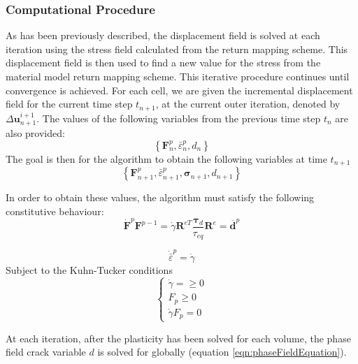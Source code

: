 \documentclass[sn-mathphys,Numbered,draft]{sn-jnl}%
\begin{document}
\subsubsection{Computational Procedure}

As has been previously described, the displacement field is solved at each iteration using the stress field calculated from the return mapping scheme. This displacement field is then used to find a new value for the stress from the material model return mapping scheme. This iterative procedure continues until convergence is achieved. For each cell, we are given the incremental displacement field for the current time step $t_{n+1}$, at the current outer iteration, denoted by $\Delta \mathbf{u}_{n+1}^{i+1}$. The values of the following variables from the previous time step $t_{n}$ are also provided:
\begin{equation}
\left\{\mathbf{F}_n^p, \bar{\varepsilon}^p_n, d_n\right\}
\end{equation}
The goal is then for the algorithm to obtain the following variables at time $t_{n+1}$
\begin{equation}
\left\{\mathbf{F}_{n+1}^p, \bar{\varepsilon}^p_{n+1},\boldsymbol{\sigma}_{n+1}, d_{n+1}\right\}
\end{equation}

In order to obtain these values, the algorithm must satisfy the following constitutive behaviour:
\begin{equation}
\dot{\boldsymbol{F}}^p \boldsymbol{F}^{p-1}=\dot{\gamma} \boldsymbol{R}^{e T} \frac{\boldsymbol{\tau}_d}{\tau_{eq}} \boldsymbol{R}^e=\overline{\boldsymbol{d}}^p 
\end{equation}

\begin{equation}
\dot{\bar{\varepsilon}}^p=\dot{\gamma}
\end{equation}
Subject to the Kuhn-Tucker conditions 
\begin{equation}
\left\{\begin{array}{c}
\dot{\gamma}=\geq 0 \\
F_p\geq 0 \\
\dot{\gamma}F_p=0
\end{array}\right.
\end{equation}

At each iteration, after the plasticity has been solved for each volume, the phase field crack variable $d$ is solved for globally (equation \ref{eqn:phaseFieldEquation}).
\end{document}
